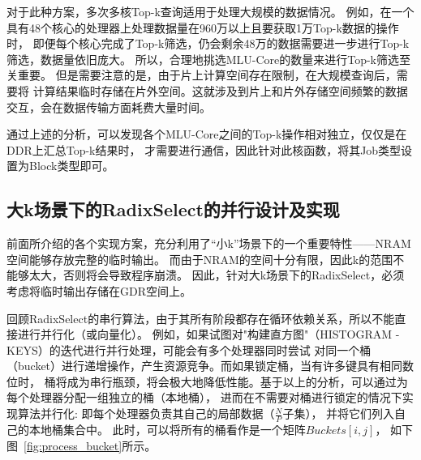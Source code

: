 对于此种方案，多次多核Top-k查询适用于处理大规模的数据情况。
例如，在一个具有48个核心的处理器上处理数据量在960万以上且要获取1万Top-k数据的操作时，
即便每个核心完成了Top-k筛选，仍会剩余48万的数据需要进一步进行Top-k筛选，数据量依旧庞大。
所以，合理地挑选MLU-Core的数量来进行Top-k筛选至关重要。
但是需要注意的是，由于片上计算空间存在限制，在大规模查询后，需要将
计算结果临时存储在片外空间。这就涉及到片上和片外存储空间频繁的数据交互，会在数据传输方面耗费大量时间。

通过上述的分析，可以发现各个MLU-Core之间的Top-k操作相对独立，仅仅是在DDR上汇总Top-k结果时，
才需要进行通信，因此针对此核函数，将其Job类型设置为Block类型即可。


  \subsection{大k场景下的RadixSelect的并行设计及实现}

  前面所介绍的各个实现方案，充分利用了“小k”场景下的一个重要特性——NRAM空间能够存放完整的临时输出。
  而由于NRAM的空间十分有限，因此k的范围不能够太大，否则将会导致程序崩溃。
  因此，针对大k场景下的RadixSelect，必须考虑将临时输出存储在GDR空间上。
  
  回顾RadixSelect的串行算法，由于其所有阶段都存在循环依赖关系，所以不能直接进行并行化（或向量化）。
  例如，如果试图对"构建直方图"（HISTOGRAM - KEYS）的迭代进行并行处理，可能会有多个处理器同时尝试
  对同一个桶（bucket）进行递增操作，产生资源竞争。而如果锁定桶，当有许多键具有相同数位时，
  桶将成为串行瓶颈，将会极大地降低性能。基于以上的分析，可以通过为每个处理器分配一组独立的桶（本地桶），
进而在不需要对桶进行锁定的情况下实现算法并行化:
即每个处理器负责其自己的局部数据（\(\frac{N}{P}\)子集），
并将它们列入自己的本地桶集合中。
此时，可以将所有的桶看作是一个矩阵\(Buckets[i, j]\)，
如下图~\ref{fig:process_bucket}所示。

